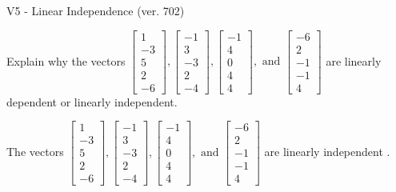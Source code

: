 \begin{exercise}
  \begin{exerciseTitle}V5 - Linear Independence (ver. 702)\end{exerciseTitle}
  \begin{exerciseStatement}
    Explain why the vectors \(\left[\begin{array}{r}
1 \\
-3 \\
5 \\
2 \\
-6
\end{array}\right] , \left[\begin{array}{r}
-1 \\
3 \\
-3 \\
2 \\
-4
\end{array}\right] , \left[\begin{array}{r}
-1 \\
4 \\
0 \\
4 \\
4
\end{array}\right] , \text{ and } \left[\begin{array}{r}
-6 \\
2 \\
-1 \\
-1 \\
4
\end{array}\right]\) are linearly dependent or linearly independent.	


  \end{exerciseStatement}
  \begin{exerciseAnswer}
   The vectors \(\left[\begin{array}{r}
1 \\
-3 \\
5 \\
2 \\
-6
\end{array}\right] , \left[\begin{array}{r}
-1 \\
3 \\
-3 \\
2 \\
-4
\end{array}\right] , \left[\begin{array}{r}
-1 \\
4 \\
0 \\
4 \\
4
\end{array}\right] , \text{ and } \left[\begin{array}{r}
-6 \\
2 \\
-1 \\
-1 \\
4
\end{array}\right]\) are 
  	 linearly independent  .
  


  \end{exerciseAnswer}
\end{exercise}